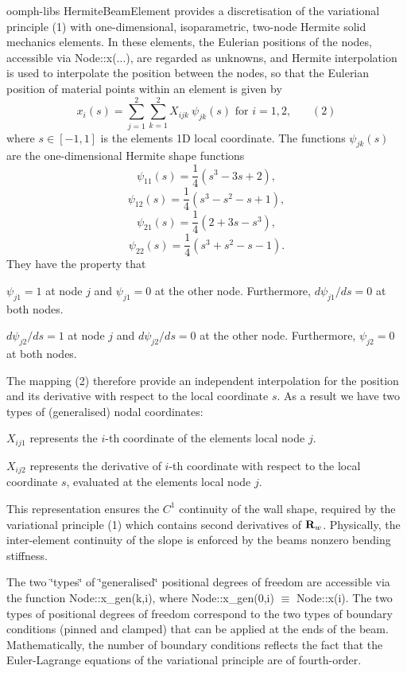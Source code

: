 \label{index_hermite}%
%
{\ttfamily oomph-\/lib\textquotesingle{}s} {\ttfamily Hermite\+Beam\+Element} provides a discretisation of the variational principle (1) with one-\/dimensional, isoparametric, two-\/node Hermite solid mechanics elements. In these elements, the Eulerian positions of the nodes, accessible via {\ttfamily Node\+::x}(...), are regarded as unknowns, and Hermite interpolation is used to interpolate the position between the nodes, so that the Eulerian position of material points within an element is given by \[ x_i(s) = \sum_{j=1}^2 \sum_{k=1}^2 X_{ijk} \ \psi_{jk}(s) \mbox{\ \ \ for $i=1,2$}, \ \ \ \ \ \ \ \ (2) \] where $ s \in [-1,1] $ is the element\textquotesingle{}s 1D local coordinate. The functions $ \psi_{jk}(s) $ are the one-\/dimensional Hermite shape functions \[ \psi_{11}(s) = \frac{1}{4}\left(s^3 - 3s + 2\right), \] \[ \psi_{12}(s) = \frac{1}{4}\left(s^3 - s^2 - s +1 \right), \] \[ \psi_{21}(s) = \frac{1}{4}\left(2 + 3 s - s^3\right), \] \[ \psi_{22}(s) = \frac{1}{4}\left(s^3 + s^2 -s -1 \right). \] They have the property that
\begin{DoxyItemize}
\item $ \psi_{j1} = 1 $ at node $ j $ and $ \psi_{j1} = 0 $ at the other node. Furthermore, $ d\psi_{j1}/ds = 0 $ at both nodes.
\item $ d\psi_{j2}/ds = 1 $ at node $ j $ and $ d\psi_{j2}/ds = 0 $ at the other node. Furthermore, $ \psi_{j2} = 0 $ at both nodes.
\end{DoxyItemize}The mapping (2) therefore provide an independent interpolation for the position and its derivative with respect to the local coordinate $ s $. As a result we have two types of (generalised) nodal coordinates\+:
\begin{DoxyItemize}
\item $ X_{ij1} $ represents the $ i $-\/th coordinate of the element\textquotesingle{}s local node $ j $.
\item $ X_{ij2} $ represents the derivative of $ i $-\/th coordinate with respect to the local coordinate $ s $, evaluated at the element\textquotesingle{}s local node $ j $.
\end{DoxyItemize}This representation ensures the $ C^1 $ continuity of the wall shape, required by the variational principle (1) which contains second derivatives of $ {\bf R}_w $. Physically, the inter-\/element continuity of the slope is enforced by the beam\textquotesingle{}s nonzero bending stiffness.

\label{index_solid_bound}%
%
The two \char`\"{}types\char`\"{} of \char`\"{}generalised\char`\"{} positional degrees of freedom are accessible via the function {\ttfamily Node\+::x\+\_\+gen(k,i)}, where {\ttfamily Node\+::x\+\_\+gen(0,i)} $ \equiv $ {\ttfamily Node\+::x(i)}. The two types of positional degrees of freedom correspond to the two types of boundary conditions (pinned and clamped) that can be applied at the ends of the beam. Mathematically, the number of boundary conditions reflects the fact that the Euler-\/\+Lagrange equations of the variational principle are of fourth-\/order.

